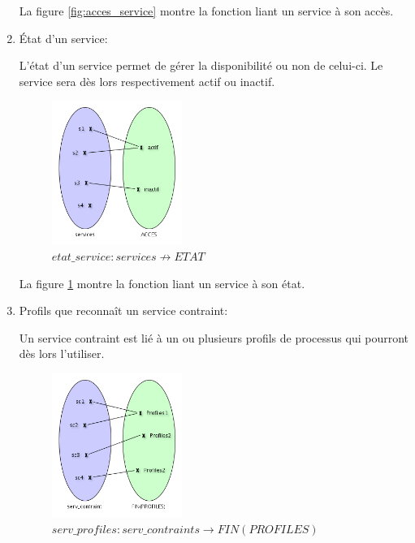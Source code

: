 \documentclass[french, titlepage, 10pt, a4paper]{article}
\begin{document}
\begin{enumerate}
    La figure \ref{fig:acces_service} montre la fonction liant un service à son
    accès.

  \item État d'un service:

    L'état d'un service permet de gérer la disponibilité ou non de celui-ci.
    Le service sera dès lors respectivement actif ou inactif.

    \begin{figure}[htb]
      \centering
      \includegraphics[width=0.4\textwidth]{etat_service.png}
      \caption{$etat\_service: services \nrightarrow ETAT$}
      \label{fig:etat_service}
    \end{figure}

    La figure \ref{fig:etat_service} montre la fonction liant un service à son
    état.

  \item Profils que reconnaît un service contraint:

    Un service contraint est lié à un ou plusieurs profils de processus qui
    pourront dès lors l'utiliser.

    \begin{figure}[htb]
      \centering
      \includegraphics[width=0.4\textwidth]{serv_profiles.png}
      \caption{$serv\_profiles: serv\_contraints \rightarrow FIN(PROFILES)$}
      \label{fig:serv_profiles}
    \end{figure}


\end{enumerate}
\end{document}
